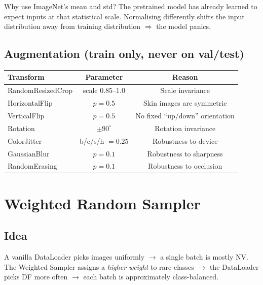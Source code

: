 \documentclass[11pt,a4paper]{article}
\begin{document}
\begin{simple}
Why use ImageNet's mean and std? The pretrained model has already learned to expect inputs at that statistical scale. Normalising differently shifts the input distribution away from training distribution $\Rightarrow$ the model panics.
\end{simple}

\subsection{Augmentation (train only, never on val/test)}

\begin{table}[h]
\centering\small
\begin{tabular}{lcc}
\toprule
\textbf{Transform} & \textbf{Parameter} & \textbf{Reason} \\
\midrule
RandomResizedCrop & scale 0.85--1.0    & Scale invariance \\
HorizontalFlip    & $p = 0.5$            & Skin images are symmetric \\
VerticalFlip      & $p = 0.5$            & No fixed ``up/down'' orientation \\
Rotation          & $\pm 90^\circ$     & Rotation invariance \\
ColorJitter       & b/c/s/h $= 0.25$   & Robustness to device \\
GaussianBlur      & $p = 0.1$            & Robustness to sharpness \\
RandomErasing     & $p = 0.1$            & Robustness to occlusion \\
\bottomrule
\end{tabular}
\end{table}

\section{Weighted Random Sampler}

\subsection{Idea}

\begin{simple}
A vanilla DataLoader picks images uniformly $\to$ a single batch is mostly NV. The Weighted Sampler assigns a \textit{higher weight} to rare classes $\to$ the DataLoader picks DF more often $\to$ each batch is approximately class-balanced.
\end{simple}
\end{document}
